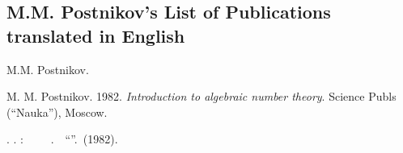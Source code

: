 \documentclass[12pt]{article}
\theoremstyle{definition}
\begin{document}
\subsection{M.M. Postnikov's List of Publications translated in English}

\begin{thebibliography}{9}


M.M. Postnikov. 


M. M. Postnikov. 1982. \emph{Introduction to algebraic number theory}. Science Publs (``Nauka''),
Moscow. 

\CYRM. \CYRM. \CYRP\cyro\cyrs\cyrt\cyrn\cyri\cyrk\cyro\cyrv:
{\em \CYRV\cyrv\cyre\cyrd\cyre\cyrn\cyri\cyre\, \cyrv\, \cyrt\cyre\cyro\cyrr\cyri\cyryu\, \cyra\cyrl\cyrg\cyre\cyrb\cyrr\cyra\cyri\cyrch\cyre\cyrs\cyrk\cyri\cyrh \,
\cyrch\cyri\cyrs\cyre\cyrl}. \,\CYRI\cyrz\cyrd\cyra\cyrt\cyre\cyrl\cyrsftsn\cyrs\cyrt\cyrv\cyro \,
``\CYRN\cyra\cyru\cyrk\cyra''. \CYRM\cyro\cyrs\cyrk\cyrv\cyra \,(1982).

\end{thebibliography}


\end{document}
